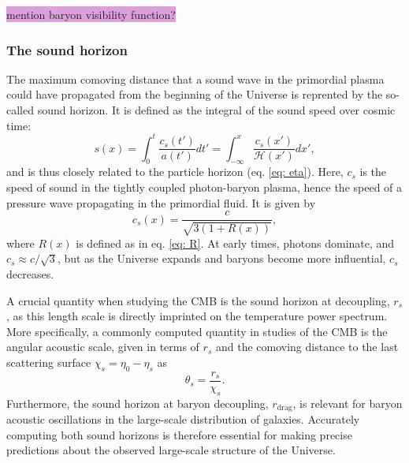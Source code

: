 \documentclass{aa}
\numberwithin{equation}{section}
\numberwithin{table}{section}
\numberwithin{figure}{section}
\begin{document}
\colorbox{Plum}{mention baryon visibility function?}




\subsubsection{The sound horizon}\label{subsubsec: II theory sound}
The maximum comoving distance that a sound wave in the primordial plasma could have propagated from the beginning of the Universe is reprented by the so-called sound horizon. It is defined as the integral of the sound speed over cosmic time:
\begin{equation}
s(x) = \int_0^t \frac{c_s(t')}{a(t')} dt' = \int_{-\infty}^x \frac{c_s(x')}{\mathcal{H}(x')} dx',
\end{equation}
and is thus closely related to the particle horizon (eq. \eqref{eq: eta}). Here, $c_s$ is the speed of sound in the tightly coupled photon-baryon plasma, hence the speed of a pressure wave propagating in the primordial fluid. It is given by
\begin{equation}
c_s(x) = \frac{c}{\sqrt{3(1 + R(x))}},
\end{equation}
where $R(x)$ is defined as in eq. \eqref{eq: R}. At early times, photons dominate, and $c_s \approx c/\sqrt{3}$, but as the Universe expands and baryons become more influential, $c_s$ decreases.

A crucial quantity when studying the CMB is the sound horizon at decoupling, $r_s$, as this length scale is directly imprinted on the temperature power spectrum. More specifically, a commonly computed quantity in studies of the CMB is the angular acoustic scale, given in terms of $r_s$ and the comoving distance to the last scattering surface $\chi_s=\eta_0-\eta_s$ as
\begin{equation}
  \theta_s = \frac{r_s}{\chi_s}.
\end{equation}
Furthermore, the sound horizon at baryon decoupling, $r_\text{drag}$, is relevant for baryon acoustic oscillations in the large-scale distribution of galaxies. Accurately computing both sound horizons is therefore essential for making precise predictions about the observed large-scale structure of the Universe.


\end{document}
